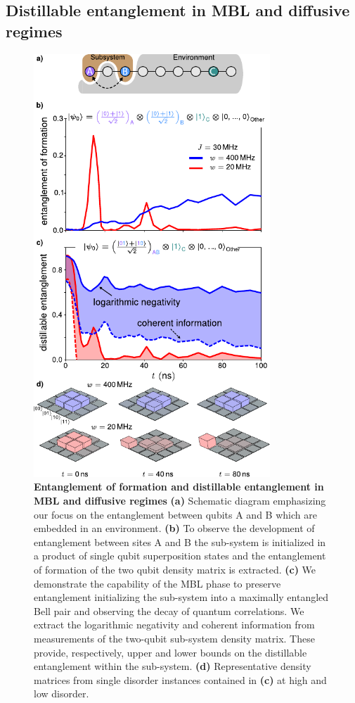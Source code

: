 \subsection{Distillable entanglement in MBL and diffusive regimes}
\begin{figure}[h]
\centering
\includegraphics[width=89mm, keepaspectratio]{./PDF/f6_190716_1129a.pdf}
\caption{\textbf{Entanglement of formation and distillable entanglement in MBL and diffusive regimes}
        \textbf{(a)} Schematic diagram emphasizing our focus on the entanglement between qubits A and B which are embedded in an environment.
        \textbf{(b)} To observe the development of entanglement between sites A and B the sub-system is initialized in a product of single qubit superposition states and the entanglement of formation of the two qubit density matrix is extracted.
        \textbf{(c)} We demonstrate the capability of the MBL phase to preserve entanglement initializing the sub-system into a maximally entangled Bell pair and observing the decay of quantum correlations.
        We extract the logarithmic negativity and coherent information from measurements of the two-qubit sub-system density matrix.
        These provide, respectively, upper and lower bounds on the distillable entanglement within the sub-system.
        \textbf{(d)} Representative density matrices from single disorder instances contained in \textbf{(c)} at high and low disorder.
        }

\end{figure}

